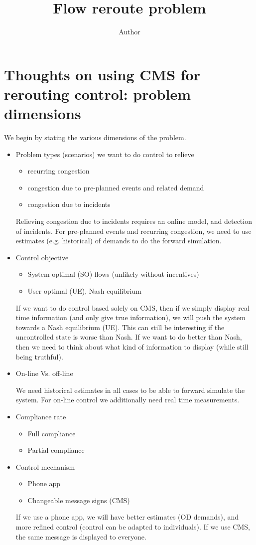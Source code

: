 \documentclass[10pt,a4paper]{article}
\title{Flow reroute problem}
\author{Author}
\begin{document}
\maketitle

\section{Thoughts on using CMS for rerouting control: problem dimensions}

We begin by stating the various dimensions of the problem.
\begin{itemize}
\item Problem types (scenarios) we want to do control to relieve
	\begin{itemize}
	\item recurring congestion
	\item congestion due to pre-planned events and related demand
	\item congestion due to incidents
	\end{itemize}
	Relieving congestion due to incidents requires an online model, and detection of incidents. For pre-planned events and recurring congestion, we need to use estimates (e.g. historical) of demands to do the forward simulation.
\item Control objective
	\begin{itemize}
	\item System optimal (SO) flows (unlikely without incentives)
	\item User optimal (UE), Nash equilibrium
	\end{itemize}
	If we want to do control based solely on CMS, then if we simply display real time information (and only give true information), we will push the system towards a Nash equilibrium (UE). This can still be interesting if the uncontrolled state is worse than Nash. If we want to do better than Nash, then we need to think about what kind of information to display (while still being truthful).
\item On-line Vs. off-line

	We need historical estimates in all cases to be able to forward simulate the system. For on-line control we additionally need real time measurements.
	
\item Compliance rate
	\begin{itemize}
	\item Full compliance
	\item Partial compliance
	\end{itemize}
\item Control mechanism
	\begin{itemize}
	\item Phone app
	\item Changeable message signs (CMS)
	\end{itemize}
	If we use a phone app, we will have better estimates (OD demands), and more refined control (control can be adapted to individuals). If we use CMS, the same message is displayed to everyone.
	

\end{itemize}
\end{document}
